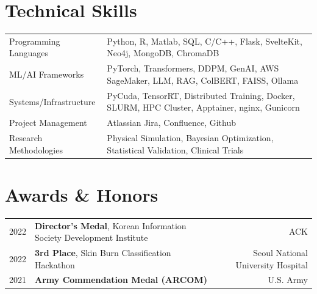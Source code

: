 \documentclass[a4paper,10pt]{article}
\begin{document}
\section{Technical Skills}
\begin{tabularx}{\linewidth}{@{}l X@{}}
Programming Languages &  \normalsize{Python, R, Matlab, SQL, C/C++, Flask, SvelteKit, Neo4j, MongoDB, ChromaDB}\\
ML/AI Frameworks &  \normalsize{PyTorch, Transformers, DDPM, GenAI, AWS SageMaker, LLM, RAG, ColBERT, FAISS, Ollama}\\
Systems/Infrastructure &  \normalsize{PyCuda, TensorRT, Distributed Training, Docker, SLURM, HPC Cluster, Apptainer, nginx, Gunicorn}\\
Project Management &  \normalsize{Atlassian Jira, Confluence, Github}\\
Research Methodologies &  \normalsize{Physical Simulation, Bayesian Optimization, Statistical Validation, Clinical Trials}\\
\end{tabularx}
\vspace{2.0pt}

\section{Awards \& Honors}
\begin{tabularx}{\linewidth}{@{}l X r@{}}
2022 & \textbf{Director's Medal}, Korean Information Society Development Institute & ACK \\
2022 & \textbf{3rd Place}, Skin Burn Classification Hackathon & Seoul National University Hospital \\
2021 & \textbf{Army Commendation Medal (ARCOM)} & U.S. Army \\
\end{tabularx}


\vfill
{}
\end{document}

